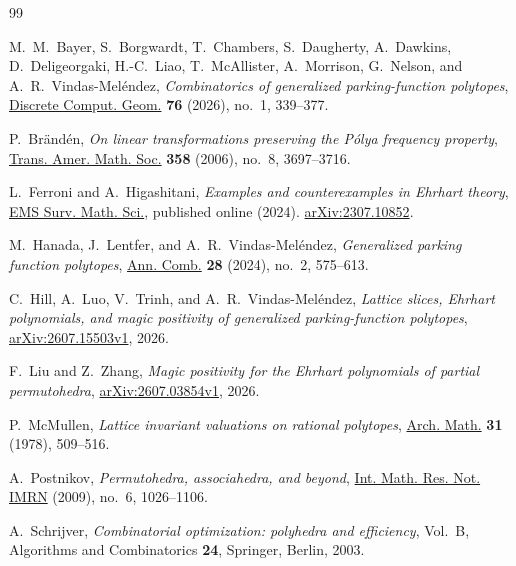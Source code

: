 \documentclass[11pt,letterpaper]{article}
\theoremstyle{result}
\theoremstyle{remark}
\begin{document}
\begin{thebibliography}{99}
\small\raggedright
\setlength{\itemsep}{3pt plus 1pt}

M.~M.~Bayer, S.~Borgwardt, T.~Chambers, S.~Daugherty, A.~Dawkins, D.~Deligeorgaki, H.-C.~Liao, T.~McAllister, A.~Morrison, G.~Nelson, and A.~R.~Vindas-Mel\'endez,
\emph{Combinatorics of generalized parking-function polytopes},
\href{https://doi.org/10.1007/s00454-025-00770-1}{Discrete Comput. Geom.} \textbf{76} (2026), no.~1, 339--377.

P.~Br\"and\'en,
\emph{On linear transformations preserving the P\'olya frequency property},
\href{https://doi.org/10.1090/S0002-9947-06-03856-6}{Trans. Amer. Math. Soc.} \textbf{358} (2006), no.~8, 3697--3716.

L.~Ferroni and A.~Higashitani,
\emph{Examples and counterexamples in Ehrhart theory},
\href{https://doi.org/10.4171/EMSS/86}{EMS Surv. Math. Sci.}, published online (2024).
\href{https://arxiv.org/abs/2307.10852}{arXiv:2307.10852}.

M.~Hanada, J.~Lentfer, and A.~R.~Vindas-Mel\'endez,
\emph{Generalized parking function polytopes},
\href{https://doi.org/10.1007/s00026-023-00671-1}{Ann. Comb.} \textbf{28} (2024), no.~2, 575--613.

C.~Hill, A.~Luo, V.~Trinh, and A.~R.~Vindas-Mel\'endez,
\emph{Lattice slices, Ehrhart polynomials, and magic positivity of generalized parking-function polytopes},
\href{https://arxiv.org/abs/2607.15503v1}{arXiv:2607.15503v1}, 2026.

F.~Liu and Z.~Zhang,
\emph{Magic positivity for the Ehrhart polynomials of partial permutohedra},
\href{https://arxiv.org/abs/2607.03854v1}{arXiv:2607.03854v1}, 2026.

P.~McMullen,
\emph{Lattice invariant valuations on rational polytopes},
\href{https://doi.org/10.1007/BF01226481}{Arch. Math.} \textbf{31} (1978), 509--516.

A.~Postnikov,
\emph{Permutohedra, associahedra, and beyond},
\href{https://doi.org/10.1093/imrn/rnn153}{Int. Math. Res. Not. IMRN} (2009), no.~6, 1026--1106.

A.~Schrijver,
\emph{Combinatorial optimization: polyhedra and efficiency}, Vol.~B,
Algorithms and Combinatorics \textbf{24}, Springer, Berlin, 2003.

\end{thebibliography}
\end{document}
